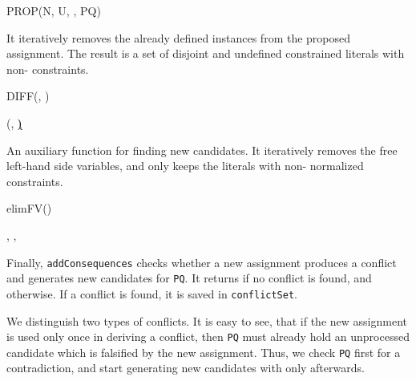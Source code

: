 \documentclass[a4paper]{article}
\begin{document}
{\begin{function}
	\caption{PROP(N, U, , PQ)}
	\;
\end{function}
It iteratively removes the already defined instances from the proposed assignment. 
The result is a set of disjoint and undefined constrained literals with non- constraints.
\begin{function}
	
	\caption{DIFF(, )}
	(, \k)  \UNIF{, }\;
	  \;
	\For{\i = , \dots, \k}{
  \;
	}	
	\KwRet{}\;
\end{function}
An auxiliary function for finding new candidates. 
It iteratively removes the free left-hand side variables, and only keeps the 
literals with non- normalized constraints.
\begin{function}
	
	\caption{elimFV()}
	,   , \;
	\KwRet{}
\end{function}
Finally, \texttt{addConsequences} checks whether a new assignment produces a conflict and generates new 
candidates for \texttt{PQ}. It returns  if no conflict is found, and  otherwise. 
If a conflict is found, it is saved in \texttt{conflictSet}. 

We distinguish two types of conflicts.
It is easy to see, that if the new assignment is used only once in deriving a conflict, then 
\texttt{PQ} must already hold an unprocessed candidate which is falsified by the new assignment.
Thus, we check \texttt{PQ} first for a contradiction, and start generating new candidates with 
only afterwards.

}
\end{document}
